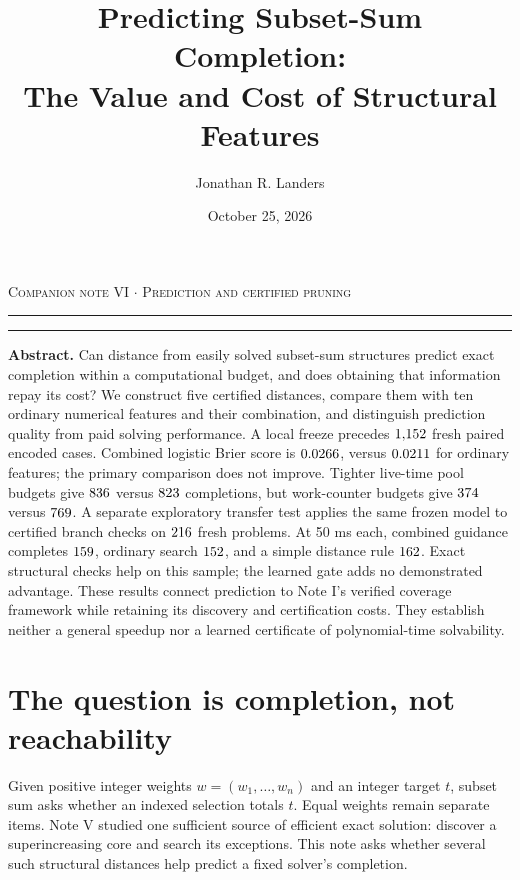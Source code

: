 \documentclass[10pt,english]{article}
\title{\sffamily\bfseries Predicting Subset-Sum Completion:\\The Value and Cost of Structural Features}
\author{Jonathan R. Landers}
\date{October 25, 2026}
\begin{document}
\maketitle
\vspace{-1em}
\noindent\textcolor{paperaccent}{\footnotesize\textsc{Companion note VI \(\cdot\) Prediction and certified pruning}}
\par\noindent\textcolor{paperaccent}{\rule{.11\linewidth}{1.5pt}}\textcolor{paperline}{\rule{.89\linewidth}{.45pt}}
\vspace{.5em}

\begin{tcolorbox}[accentbox]
\textbf{Abstract.} Can distance from easily solved subset-sum structures predict exact completion within a computational budget, and does obtaining that information repay its cost? We construct five certified distances, compare them with ten ordinary numerical features and their combination, and distinguish prediction quality from paid solving performance. A local freeze precedes \(1{,}152\) fresh paired encoded cases. Combined logistic Brier score is \(0.0266\), versus \(0.0211\) for ordinary features; the primary comparison does not improve. Tighter live-time pool budgets give \(836\) versus \(823\) completions, but work-counter budgets give \(374\) versus \(769\). A separate exploratory transfer test applies the same frozen model to certified branch checks on \(216\) fresh problems. At 50 ms each, combined guidance completes \(159\), ordinary search \(152\), and a simple distance rule \(162\). Exact structural checks help on this sample; the learned gate adds no demonstrated advantage. These results connect prediction to Note I's verified coverage framework while retaining its discovery and certification costs. They establish neither a general speedup nor a learned certificate of polynomial-time solvability.
\end{tcolorbox}

\section{The question is completion, not reachability}
Given positive integer weights \(w=(w_1,\ldots,w_n)\) and an integer target \(t\), subset sum asks whether an indexed selection totals \(t\). Equal weights remain separate items. Note V studied one sufficient source of efficient exact solution: discover a superincreasing core and search its exceptions. This note asks whether several such structural distances help predict a fixed solver's completion.
\end{document}

